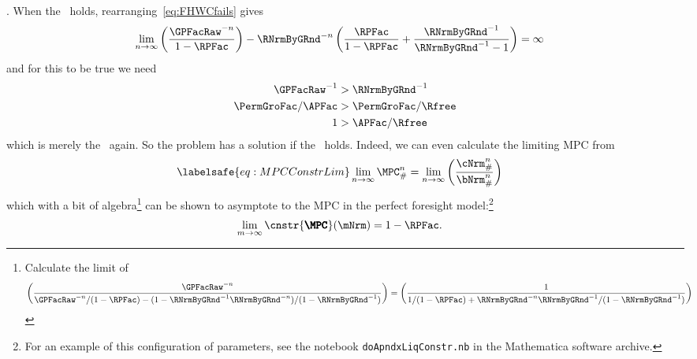 \documentclass[\econtexRoot/BufferStockTheory]{subfiles}
\begin{document}
.
When the \RIC~holds, rearranging~\eqref{eq:FHWCfails} gives
\begin{eqnarray*}
  \lim_{n \rightarrow \infty} \left(\frac{\GPFacRaw^{-n}}{1-\RPFac}\right)-\RNrmByGRnd^{-n}\left(\frac{\RPFac}{1-\RPFac}+\frac{\RNrmByGRnd^{-1}}{\RNrmByGRnd^{-1}-1}\right)  & = \infty
\end{eqnarray*}
and for this to be true we need
\begin{eqnarray*}
  \GPFacRaw^{-1}  & > \RNrmByGRnd^{-1}
  \\ \PermGroFac/\APFac  & > \PermGroFac/\Rfree
  \\ 1  & > \APFac/\Rfree
\end{eqnarray*}
which is merely the \RIC~again.
So the problem has a solution if the \RIC~holds.
Indeed,
we can even calculate the limiting MPC from
\begin{equation}\begin{gathered}\begin{aligned}\labelsafe{eq:MPCConstrLim}
  \lim_{n \rightarrow \infty} \MPC^{n}_{\#}  & = \lim_{n \rightarrow \infty} \left(\frac{\cNrm_{\#}^{n}}{\bNrm_{\#}^{n}}\right) 
\end{aligned}\end{gathered}\end{equation}
which with a bit of algebra\footnote{
  Calculate the limit of
  \begin{equation}\begin{gathered}\begin{aligned}
    \left(\frac{\GPFacRaw^{-n}}{\GPFacRaw^{-n}/(1-\RPFac) - (1-\RNrmByGRnd^{-1}\RNrmByGRnd^{-n})/(1-\RNrmByGRnd^{-1})}\right)  & = \left(\frac{1}{1/(1-\RPFac) + \RNrmByGRnd^{-n}\RNrmByGRnd^{-1}/(1-\RNrmByGRnd^{-1})}\right)
  \end{aligned}\end{gathered}\end{equation}} can be shown to asymptote to the MPC in the perfect foresight model:\footnote{For an example of this configuration of parameters, see the notebook \texttt{doApndxLiqConstr.nb} in the Mathematica software  archive.}
\begin{equation}\begin{gathered}\begin{aligned}
  \lim_{m \rightarrow \infty} \cnstr{\pmb{\MPC}}(\mNrm)  & = 1-\RPFac.
\end{aligned}\end{gathered}\end{equation}
\end{document}
